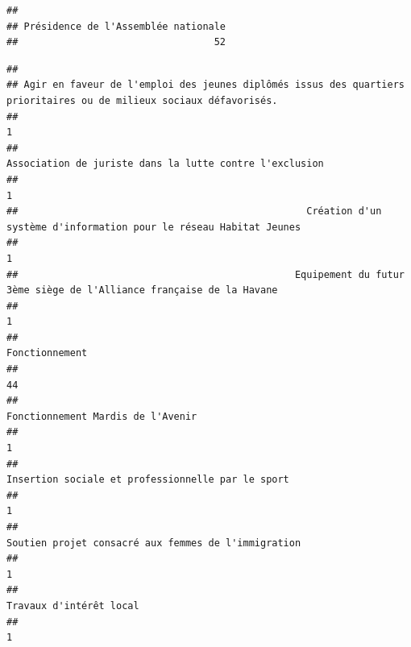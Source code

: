 \documentclass[
]{book}
\newenvironment{Shaded}{\begin{snugshade}}{\end{snugshade}}
\newcommand{\FunctionTok}[1]{\textcolor[rgb]{0.13,0.29,0.53}{\textbf{#1}}}
\newcommand{\NormalTok}[1]{#1}
\newcommand{\SpecialCharTok}[1]{\textcolor[rgb]{0.81,0.36,0.00}{\textbf{#1}}}
\begin{document}
\begin{verbatim}
## 
## Présidence de l'Assemblée nationale 
##                                  52
\end{verbatim}

\begin{Shaded}
\end{Shaded}

\begin{verbatim}
## 
## Agir en faveur de l'emploi des jeunes diplômés issus des quartiers prioritaires ou de milieux sociaux défavorisés. 
##                                                                                                                  1 
##                                                            Association de juriste dans la lutte contre l'exclusion 
##                                                                                                                  1 
##                                                  Création d'un système d'information pour le réseau Habitat Jeunes 
##                                                                                                                  1 
##                                                Equipement du futur 3ème siège de l'Alliance française de la Havane 
##                                                                                                                  1 
##                                                                                                     Fonctionnement 
##                                                                                                                 44 
##                                                                                  Fonctionnement Mardis de l'Avenir 
##                                                                                                                  1 
##                                                                  Insertion sociale et professionnelle par le sport 
##                                                                                                                  1 
##                                                                Soutien projet consacré aux femmes de l'immigration 
##                                                                                                                  1 
##                                                                                            Travaux d'intérêt local 
##                                                                                                                  1
\end{verbatim}
\end{document}
